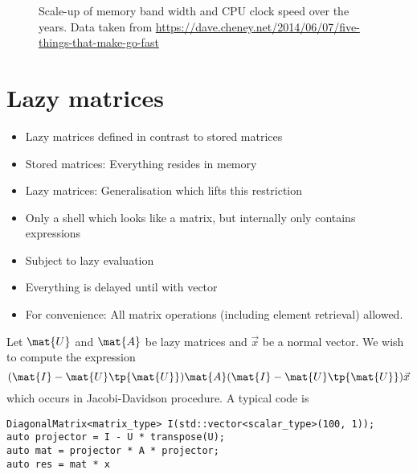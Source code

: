 \begin{figure}
	\centering
	\caption{Scale-up of memory band width and CPU clock speed over the years.
	Data taken from \url{https://dave.cheney.net/2014/06/07/five-things-that-make-go-fast}
	}
	\label{fig:MemCpuSpeedup}
\end{figure}


\section{Lazy matrices}

\begin{itemize}
	\item Lazy matrices defined in contrast to stored matrices
	\item Stored matrices: Everything resides in memory
	\item Lazy matrices: Generalisation which lifts this restriction
	\item Only a shell which looks like a matrix, but internally only contains expressions
	\item Subject to lazy evaluation
	\item Everything is delayed until \contraction with vector
	\item For convenience: All matrix operations (including element retrieval) allowed.
\end{itemize}

Let $\mat{U}$ and $\mat{A}$ be lazy matrices and $\vec{x}$ be a normal vector.
We wish to compute the expression
\[ (\mat{I} - \mat{U} \tp{\mat{U}}) \mat{A} (\mat{I} - \mat{U} \tp{\mat{U}}) \vec{x} \]
which occurs in Jacobi-Davidson procedure.
A typical code is
\begin{lstlisting}
DiagonalMatrix<matrix_type> I(std::vector<scalar_type>(100, 1));
auto projector = I - U * transpose(U);
auto mat = projector * A * projector;
auto res = mat * x
\end{lstlisting}




